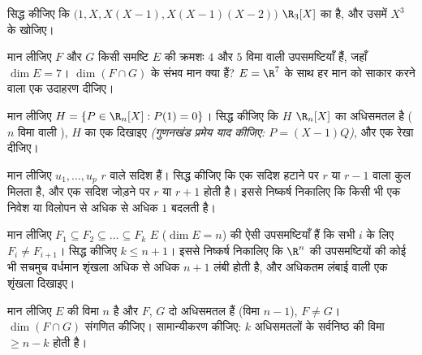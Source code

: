 \begin{exercise}[$\star$]\label{exo:b1:findim:4}
सिद्ध कीजिए कि $\bigl(1, X, X(X-1), X(X-1)(X-2)\bigr)$ $\R_3[X]$ का  है,
और उसमें $X^3$ के  खोजिए।
\end{exercise}

\begin{exercise}[$\star\star$]\label{exo:b1:findim:5}
मान लीजिए $F$ और $G$ किसी समष्टि $E$ की क्रमशः $4$ और $5$ विमा वाली
उपसमष्टियाँ हैं, जहाँ $\dim E = 7$। $\dim(F \cap G)$ के संभव मान क्या हैं?
$E = \R^7$ के साथ हर मान को साकार करने वाला एक उदाहरण दीजिए।
\end{exercise}

\begin{exercise}[$\star\star$]\label{exo:b1:findim:6}
मान लीजिए $H = \{P \in \R_n[X] : P(1) = 0\}$। सिद्ध कीजिए कि $H$ $\R_n[X]$
का अधिसमतल है ($n$ विमा वाली ), $H$ का एक  दिखाइए \emph{(गुणनखंड
प्रमेय याद कीजिए: $P = (X-1)Q$)}, और एक  रेखा दीजिए।
\end{exercise}

\begin{exercise}[$\star\star$]\label{exo:b1:findim:7}
मान लीजिए $u_1, \dots, u_p$ $r$  वाले सदिश हैं। सिद्ध कीजिए कि एक सदिश
हटाने पर $r$ या $r - 1$  वाला कुल मिलता है, और एक सदिश जोड़ने पर 
$r$ या $r + 1$ होती है। इससे निष्कर्ष निकालिए कि किसी भी एक निवेश या विलोपन
से  अधिक से अधिक $1$ बदलती है।
\end{exercise}

\begin{exercise}[$\star\star\star$]\label{exo:b1:findim:8}
मान लीजिए $F_1 \subseteq F_2 \subseteq \dots \subseteq F_k$ $E$ ($\dim E =
n$) की ऐसी उपसमष्टियाँ हैं कि सभी $i$ के लिए $F_i \neq F_{i+1}$। सिद्ध कीजिए
$k \leq n + 1$। इससे निष्कर्ष निकालिए कि $\R^n$ की उपसमष्टियों की कोई भी
सचमुच वर्धमान शृंखला अधिक से अधिक $n + 1$ लंबी होती है, और अधिकतम लंबाई वाली
एक शृंखला दिखाइए।
\end{exercise}

\begin{exercise}[$\star\star\star$]\label{exo:b1:findim:9}
मान लीजिए $E$ की विमा $n$ है और $F$, $G$ दो अधिसमतल हैं (विमा $n - 1$), $F
\neq G$। $\dim(F \cap G)$ संगणित कीजिए। सामान्यीकरण कीजिए: $k$ अधिसमतलों के
सर्वनिष्ठ की विमा $\geq n - k$ होती है।
\end{exercise}


